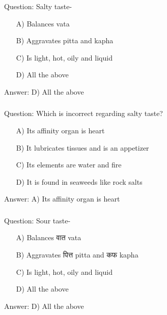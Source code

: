 \begin{frame}[fragile]\frametitle{}

Question: Salty taste-

\begin{itemize}
\item[A)] Balances vata
\item[B)] Aggravates pitta and kapha
\item[C)] Is light, hot, oily and liquid
\item[D)] All the above
\end{itemize}

Answer: D) All the above
\end{frame}

\begin{frame}[fragile]\frametitle{}

Question: Which is incorrect regarding salty taste?

\begin{itemize}
\item[A)] Its affinity organ is heart
\item[B)] It lubricates tissues and is an appetizer
\item[C)] Its elements are water and fire
\item[D)] It is found in seaweeds like rock salts
\end{itemize}

Answer: A) Its affinity organ is heart
\end{frame}

\begin{frame}[fragile]\frametitle{}

Question: Sour taste-

\begin{itemize}
\item[A)] Balances वात vata
\item[B)] Aggravates पित्त pitta and कफ kapha
\item[C)] Is light, hot, oily and liquid
\item[D)] All the above
\end{itemize}

Answer: D) All the above
\end{frame}

